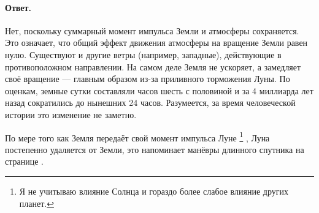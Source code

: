 \paragraph{Ответ.}
Нет, поскольку суммарный момент импульса Земли и атмосферы сохраняется.
Это означает, что общий эффект движения атмосферы на вращение Земли равен нулю.
Существуют и другие ветры (например, западные), действующие в противоположном направлении.
На самом деле Земля не ускоряет, а замедляет своё вращение --- главным образом из-за приливного торможения Луны.
По оценкам, земные сутки составляли часов шесть с половиной и за 4 миллиарда лет назад сократились до нынешних 24 часов.
Разумеется, за время человеческой истории это изменение не заметно.

По мере того как Земля передаёт свой момент импульса Луне%
\footnote{Я не учитываю влияние Солнца и гораздо более слабое влияние других планет.}%
, Луна постепенно удаляется от Земли, это напоминает манёвры длинного спутника на странице \pageref{Управление спутником}.
